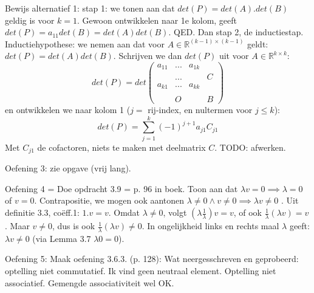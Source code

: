 \documentclass{article}
\begin{document}
Bewijs alternatief 1: stap 1: we tonen aan dat $det(P)=det(A).det(B)$ geldig is voor $k=1$. Gewoon ontwikkelen naar 1e kolom, geeft $det(P)=a_{11}det(B)= det(A)det(B)$. QED. 
Dan stap 2, de inductiestap. Inductiehypothese: we nemen aan dat voor $A \in \mathbb{R}^{(k-1)\times (k-1)}$ geldt: $det(P) = det(A)det(B)$. Schrijven we dan $det(P)$ uit voor $A \in \mathbb{R}^{k\times k}$: 
\[ det(P) = det 
\begin{pmatrix}
a_{11} & ... & a_{1k}  &  \\
       & ... &   &  C \\
a_{k1} & ... & a_{kk}  & \\
       &   &         &   \\ 
       & O   &         & B 
\end{pmatrix} \]  
en ontwikkelen we naar kolom 1 ($j = $ rij-index, en nultermen voor $j \leq k$):  
\[ det(P) = \sum_{j=1}^k (-1)^{j+1} a_{j1} C_{j1} \]
Met $C_{j1}$ de cofactoren, niets te maken met deelmatrix $C$. 
TODO: afwerken. 

Oefening 3: zie opgave (vrij lang). 

Oefening 4 = Doe opdracht 3.9 = p. 96 in boek. Toon aan dat $\lambda v = 0 \implies \lambda = 0$ of $v=0$. Contrapositie, we mogen ook aantonen $\lambda \neq 0 \land v \neq 0 \implies  \lambda v \neq 0$ . Uit definitie 3.3, co\"eff.1: $1.v = v$. Omdat $\lambda \neq 0$, volgt $ (\lambda \frac{1}{\lambda}) v = v$, of ook $  \frac{1}{\lambda} ( \lambda v ) = v$. Maar $v \neq 0$, dus is ook $  \frac{1}{\lambda} ( \lambda v ) \neq 0 $. In ongelijkheid links en rechts maal $\lambda$ geeft: $ \lambda v \neq 0$ (via Lemma 3.7 $\lambda 0 = 0$). 

Oefening 5: Maak oefening 3.6.3. (p. 128): Wat neergesschreven en geprobeerd: optelling niet commutatief. Ik vind geen neutraal element. Optelling niet associatief. Gemengde associativiteit wel OK.  
\end{document}
